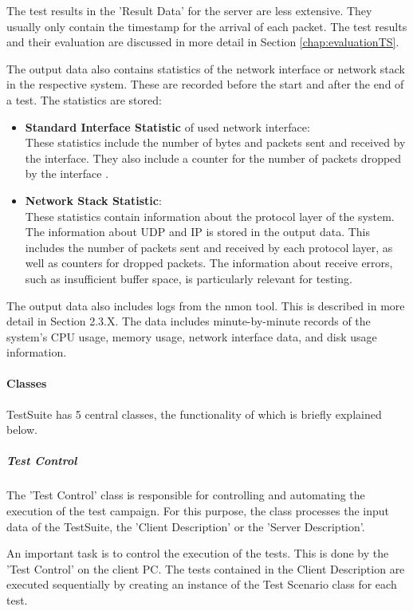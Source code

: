 The test results in the 'Result Data' for the server are less extensive. They usually only contain the timestamp for the arrival of each packet. The test results and their evaluation are discussed in more detail in Section \ref{chap:evaluationTS}.

The output data also contains statistics of the network interface or network stack in the respective system. These are recorded before the start and after the end of a test. The statistics are stored:
\begin{itemize}
	\item \textbf{Standard Interface Statistic} of used network interface: \\
	These statistics include the number of bytes and packets sent and received by the interface. They also include a counter for the number of packets dropped by the interface \cite{tsd03}.
	\item \textbf{Network Stack Statistic}: \\
	These statistics contain information about the protocol layer of the system. The information about UDP and IP is stored in the output data. This includes the number of packets sent and received by each protocol layer, as well as counters for dropped packets. The information about receive errors, such as insufficient buffer space, is particularly relevant for testing.
\end{itemize}

The output data also includes logs from the nmon tool. This is described in more detail in Section 2.3.X. The data includes minute-by-minute records of the system's CPU usage, memory usage, network interface data, and disk usage information.

\paragraph{Classes}
TestSuite has 5 central classes, the functionality of which is briefly explained below.

\subparagraph{Test Control}
The 'Test Control' class is responsible for controlling and automating the execution of the test campaign. For this purpose, the class processes the input data of the TestSuite, the 'Client Description' or the 'Server Description'.

An important task is to control the execution of the tests. This is done by the 'Test Control' on the client PC. The tests contained in the Client Description are executed sequentially by creating an instance of the Test Scenario class for each test.

